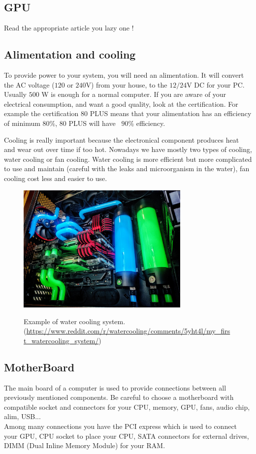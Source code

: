 \documentclass[runningheads,a4paper]{llncs}
\begin{document}
	\subsection{GPU}
	Read the appropriate article you lazy one !
	\subsection{Alimentation and cooling}
	To provide power to your system, you will need an alimentation. It will convert the AC voltage ($120$ or $240$V) from your house, to  the $12/24$V DC for your PC. Usually $500$ W is enough for a normal computer. If you are aware of your electrical consumption, and want a good quality, look at the certification. For example the certification $80$ PLUS means that your alimentation has an efficiency of minimum $80$\%, $80$ PLUS will have ~$90$\% efficiency.\par
	Cooling is really important because the electronical component produces heat and wear out over time if too hot. Nowadays we have mostly two types of cooling, water cooling or fan cooling. Water cooling is more efficient but more complicated to use and maintain (careful with the leaks and microorganism in the water), fan cooling cost less and easier to use.
	
	\begin{figure}
		\centering
		\includegraphics[width=0.75\textwidth]{Figures/watercooling}
		\\ \parbox{0.75\textwidth}{\caption[watercooling]{Example of water cooling system. (\url{https://www.reddit.com/r/watercooling/comments/5yht4l/my_first_watercooling_system/}) }\label{fig:watercooling}} 
	\end{figure}
	
	\subsection{MotherBoard}
	The main board of a computer is used to provide connections between all previously mentioned components. Be careful to choose a motherboard with compatible socket and connectors for your CPU, memory, GPU, fans, audio chip, alim, USB...\\
	Among many connections you have the PCI express which is used to connect your GPU, CPU socket to place your CPU, SATA connectors for external drives, DIMM (Dual Inline Memory Module) for your RAM.
		
\end{document}
